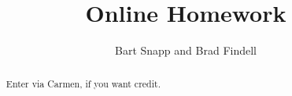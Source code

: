 \documentclass[space,nooutcomes]{xourse}
\title{Online Homework}
\author{Bart Snapp and Brad Findell}
\begin{document}
\begin{abstract}
Enter via Carmen, if you want credit.  
\end{abstract}
\maketitle

{}
\end{document}
